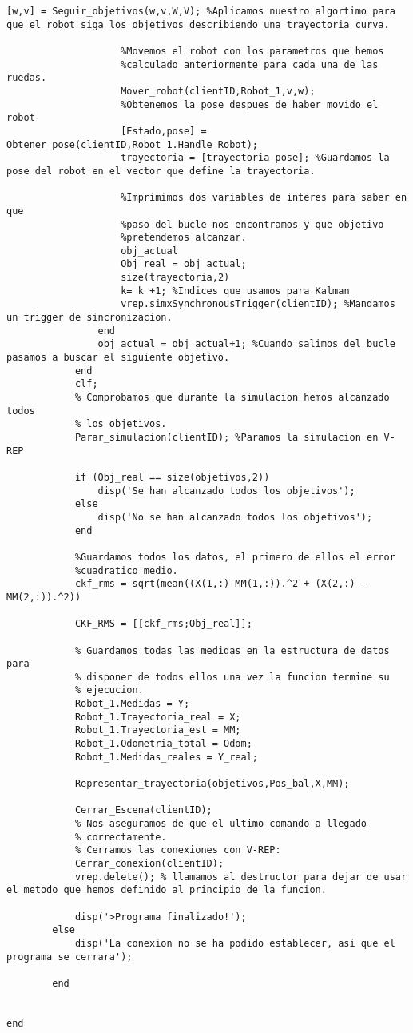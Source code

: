 \begin{lstlisting}[frame=single]
                   [w,v] = Seguir_objetivos(w,v,W,V); %Aplicamos nuestro algortimo para que el robot siga los objetivos describiendo una trayectoria curva.

                    %Movemos el robot con los parametros que hemos
                    %calculado anteriormente para cada una de las ruedas.
                    Mover_robot(clientID,Robot_1,v,w);
                    %Obtenemos la pose despues de haber movido el robot
                    [Estado,pose] = Obtener_pose(clientID,Robot_1.Handle_Robot);
                    trayectoria = [trayectoria pose]; %Guardamos la pose del robot en el vector que define la trayectoria.

                    %Imprimimos dos variables de interes para saber en que
                    %paso del bucle nos encontramos y que objetivo
                    %pretendemos alcanzar.
                    obj_actual
                    Obj_real = obj_actual;
                    size(trayectoria,2)
                    k= k +1; %Indices que usamos para Kalman
                    vrep.simxSynchronousTrigger(clientID); %Mandamos un trigger de sincronizacion.
                end
                obj_actual = obj_actual+1; %Cuando salimos del bucle pasamos a buscar el siguiente objetivo.
            end
            clf;
            % Comprobamos que durante la simulacion hemos alcanzado todos
            % los objetivos.
            Parar_simulacion(clientID); %Paramos la simulacion en V-REP
            
            if (Obj_real == size(objetivos,2))
                disp('Se han alcanzado todos los objetivos');
            else 
                disp('No se han alcanzado todos los objetivos');
            end

            %Guardamos todos los datos, el primero de ellos el error
            %cuadratico medio.
            ckf_rms = sqrt(mean((X(1,:)-MM(1,:)).^2 + (X(2,:) - MM(2,:)).^2))

            CKF_RMS = [[ckf_rms;Obj_real]];
            
            % Guardamos todas las medidas en la estructura de datos para
            % disponer de todos ellos una vez la funcion termine su
            % ejecucion.
            Robot_1.Medidas = Y;
            Robot_1.Trayectoria_real = X;
            Robot_1.Trayectoria_est = MM;
            Robot_1.Odometria_total = Odom;
            Robot_1.Medidas_reales = Y_real;

            Representar_trayectoria(objetivos,Pos_bal,X,MM);
            
            Cerrar_Escena(clientID);
            % Nos aseguramos de que el ultimo comando a llegado
            % correctamente.
            % Cerramos las conexiones con V-REP:	
            Cerrar_conexion(clientID);
            vrep.delete(); % llamamos al destructor para dejar de usar el metodo que hemos definido al principio de la funcion.

            disp('>Programa finalizado!');
        else
            disp('La conexion no se ha podido establecer, asi que el programa se cerrara');

        end

    
end
\end{lstlisting}